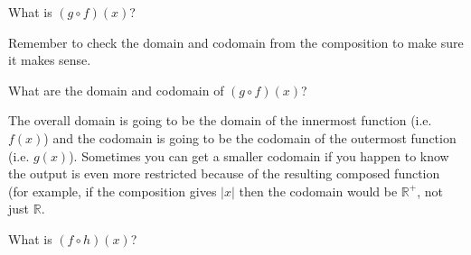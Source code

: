\documentclass{ximera}
\begin{document}
\begin{problem}
    What is $(g\circ f)(x)$? 
    \begin{multipleChoice}
        \begin{feedback}
            Remember to check the domain and codomain from the composition to make sure it makes sense.
        \end{feedback}
    \end{multipleChoice}
\end{problem}

\begin{problem}
    What are the domain and codomain of $(g\circ f)(x)$?
    \begin{multipleChoice}
    \end{multipleChoice}
    \begin{feedback}
        The overall domain is going to be the domain of the innermost function (i.e. $f(x)$) and the codomain is going to be the codomain of the outermost function (i.e. $g(x)$). Sometimes you can get a smaller codomain if you happen to know the output is even more restricted because of the resulting composed function (for example, if the composition gives $|x|$ then the codomain would be $\mathbb{R}^+$, not just $\mathbb{R}$.
    \end{feedback}
\end{problem}

\begin{problem}
    What is $(f\circ h)(x)$? 
    \begin{multipleChoice}
    \end{multipleChoice}
\end{problem}
\end{document}
